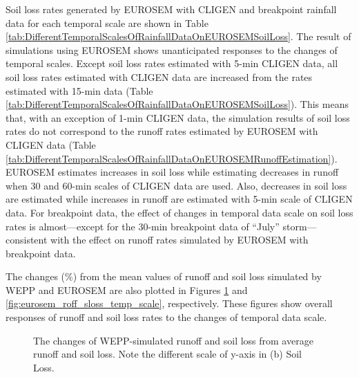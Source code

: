 Soil loss rates generated by EUROSEM with CLIGEN and breakpoint rainfall data
for each temporal scale are shown in Table
\ref{tab:DifferentTemporalScalesOfRainfallDataOnEUROSEMSoilLoss}. The result of
simulations using EUROSEM shows unanticipated responses to the changes of
temporal scales. Except soil loss rates estimated with 5-min CLIGEN data, all
soil loss rates estimated with CLIGEN data are increased from the rates
estimated with 15-min data
(Table \ref{tab:DifferentTemporalScalesOfRainfallDataOnEUROSEMSoilLoss}). This
means that, with an exception of 1-min CLIGEN data, the simulation results of
soil loss rates do not correspond to the runoff rates estimated by EUROSEM with
CLIGEN data (Table
\ref{tab:DifferentTemporalScalesOfRainfallDataOnEUROSEMRunoffEstimation}).
EUROSEM estimates increases in soil loss while estimating decreases in runoff
when 30 and 60-min scales of CLIGEN data are used. Also, decreases in soil loss
are estimated while increases in runoff are estimated with 5-min scale of CLIGEN
data. For breakpoint data, the effect of changes in temporal data scale on soil
loss rates is almost---except for the 30-min breakpoint data of ``July''
storm---consistent with the effect on runoff rates simulated by EUROSEM with
breakpoint data.

The changes (\%) from the mean values of runoff and soil loss simulated by WEPP
and EUROSEM are also plotted in Figures \ref{fig:wepp_roff_sloss_temp_scale} and
\ref{fig:eurosem_roff_sloss_temp_scale}, respectively. These figures show
overall responses of runoff and soil loss rates to the changes of temporal data
scale.

\begin{figure}[p]
  \centering
  \caption[WEPP runoff and soil loss changes]{The changes of WEPP-simulated
runoff and soil loss from average runoff and soil loss. Note the different scale
of y-axis in (b) Soil Loss.}
  \label{fig:wepp_roff_sloss_temp_scale}
\end{figure}

